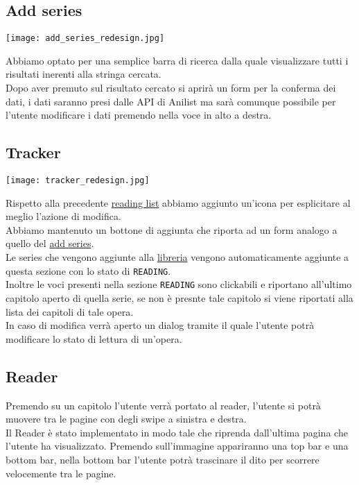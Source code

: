 \documentclass[../Assignment-3-LPSMT.tex]{subfiles}
\begin{document}
\subsection{Add series}\label{sec:add_series_redesign}

\begin{center}
   \texttt{[image: add\_series\_redesign.jpg]}
\end{center}

Abbiamo optato per una semplice barra di ricerca dalla quale visualizzare tutti i risultati inerenti alla stringa cercata.\\
Dopo aver premuto sul risultato cercato si aprirà un form per la conferma dei dati, i dati saranno presi dalle API di Anilist ma sarà comunque possibile per l'utente modificare i dati premendo nella voce in alto a destra.

\subsection{Tracker}

\begin{center}
   \texttt{[image: tracker\_redesign.jpg]}
\end{center}

 Rispetto alla precedente \hyperref[sec:reading_list]{reading list} abbiamo aggiunto un'icona per esplicitare al meglio l'azione di modifica.\\
 Abbiamo mantenuto un bottone di aggiunta che riporta ad un form analogo a quello del \hyperref[sec:add_series_redesign]{add series}.\\
 Le series che vengono aggiunte alla \hyperref[sec:home_redesign]{libreria} vengono automaticamente aggiunte a questa sezione con lo stato di \texttt{READING}.\\
 Inoltre le voci presenti nella sezione \texttt{READING} sono clickabili e riportano all'ultimo capitolo aperto di quella serie, se non è presnte tale capitolo si viene riportati alla lista dei capitoli di tale opera.\\
 In caso di modifica verrà aperto un dialog tramite il quale l'utente potrà modificare lo stato di lettura di un'opera.

\subsection{Reader}


Premendo su un capitolo l'utente verrà portato al reader, l'utente si potrà muovere tra le pagine con degli swipe a sinistra e destra.\\
Il Reader è stato implementato in modo tale che riprenda dall'ultima pagina che l'utente ha visualizzato.
Premendo sull'immagine appariranno una top bar e una bottom bar, nella bottom bar l'utente potrà trascinare il dito per scorrere velocemente tra le pagine.
\end{document}
